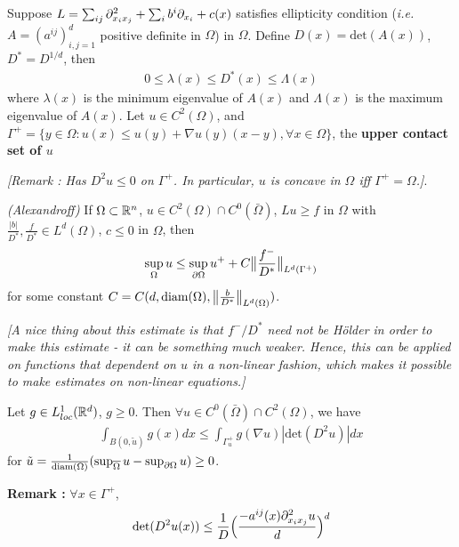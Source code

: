 \documentclass[12pt,a4paper]{article}
\begin{document}
Suppose $L = \sum_{ij} \partial^2_{x_i x_j} + \sum_{i} b^i \partial_{x_i} + c(x)$ satisfies ellipticity condition (\textit{i.e.} $A = (a^{ij})_{i,j=1}^d$ positive definite in $\Omega$) in $\Omega$. Define $D(x) = \text{det}(A(x))$, $D^* = D^{1/d}$, then
\begin{align*}
0\leq \lambda(x) \leq D^*(x) \leq \Lambda(x)
\end{align*}
where $\lambda(x)$ is the minimum eigenvalue of $A(x)$ and $\Lambda(x)$ is the maximum eigenvalue of $A(x)$. Let $u\in C^2(\Omega)$, and $\Gamma^+ = \{y\in \Omega : u(x)\leq u(y) + \nabla u(y)(x-y), \forall x\in \Omega\}$, the \textbf{upper contact set of $u$}

\emph{[Remark : Has $D^2 u \leq 0$ on $\Gamma^+$. In particular, $u$ is concave in $\Omega$ iff $\Gamma^+ =\Omega$.]}.
\s

\thm \emph{(Alexandroff)} If $\Omega \subset \mathbb{R}^n$, $u\in C^2(\Omega) \cap C^0(\bar{\Omega})$, $Lu \geq f$ in $\Omega$ with $\frac{|b|}{D^*}, \frac{f}{D^*} \in L^d(\Omega)$, $c\leq 0$ in $\Omega$, then
\begin{align*}
\sup_{\Omega} u \leq \sup_{\partial \Omega} u^+ + C\bigl\lVert\frac{f^-}{D^*}\bigr\rVert_{L^d(\Gamma^+)}
\end{align*}
for some constant $C = C(d, \text{diam}(\Omega), \bigl\lVert\frac{b}{D^*}\bigr\rVert_{L^d(\Omega)})$.

\emph{[A nice thing about this estimate is that $f^-/D^*$ need not be H\"older in order to make this estimate - it can be something much weaker. Hence, this can be applied on functions that dependent on $u$ in a non-linear fashion, which makes it possible to make estimates on non-linear equations.]}
\s

\lem Let $g \in L^1_{loc}(\mathbb{R}^d)$, $g\geq 0$. Then $\forall u \in C^0(\bar{\Omega}) \cap C^2(\Omega)$, we have
\begin{align*}
\int_{B(0, \tilde{u})}g(x) dx \leq \int_{\Gamma_{u}^+} g(\nabla u) |\text{det}(D^2 u)|dx
\end{align*}
for $\tilde{u} = \frac{1}{\text{diam}(\Omega)} (\sup_{\overline{\Omega}} u - \sup_{\partial \Omega} u) \geq 0$.
\s

\textbf{Remark :} $\forall x\in \Gamma^+$,
\begin{align*}
\text{det}(D^2u(x))\leq \frac{1}{D} \Big( \frac{-a^{ij}(x) \partial^2_{x_i x_j}u}{d}\Big)^d
\end{align*}
\s
\end{document}
